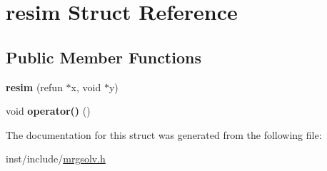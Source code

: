 \hypertarget{structresim}{}\section{resim Struct Reference}
\label{structresim}
\subsection*{Public Member Functions}
\begin{DoxyCompactItemize}
\item 
\mbox{\label{structresim_a8776836c59a5748e28d68d795569064b}} 
{\bfseries resim} (refun $\ast$x, void $\ast$y)
\item 
\mbox{\label{structresim_a66f6218d872d52eab1b2f7560f2c1b72}} 
void {\bfseries operator()} ()
\end{DoxyCompactItemize}


The documentation for this struct was generated from the following file\+:\begin{DoxyCompactItemize}
\item 
inst/include/\hyperlink{mrgsolv_8h}{mrgsolv.\+h}\end{DoxyCompactItemize}
